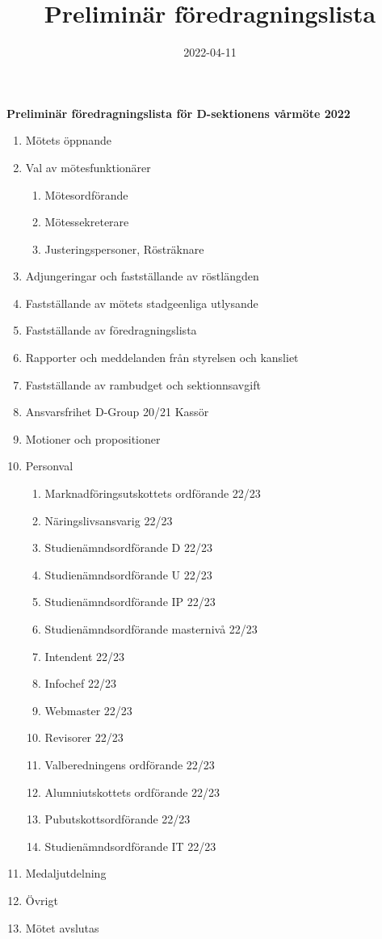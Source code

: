 \documentclass{datateknologsektionen-document}
\title{Preliminär föredragningslista}
\date{2022-04-11}
\begin{document}
\large
\begin{center}
  {\LARGE\bfseries Preliminär föredragningslista för D-sektionens vårmöte 2022}
  \vspace{2mm}
\end{center}

\Large
\begin{enumerate}[topsep=0pt,itemsep=1ex]
  \item Mötets öppnande
  \item Val av mötesfunktionärer
        \begin{enumerate}[label*=\arabic*.,leftmargin=3em]
          \item Mötesordförande
          \item Mötessekreterare
          \item Justeringspersoner, Rösträknare
        \end{enumerate}
  \item Adjungeringar och fastställande av röstlängden
  \item Fastställande av mötets stadgeenliga utlysande
  \item Fastställande av föredragningslista
  \item Rapporter och meddelanden från styrelsen och kansliet
  \item Fastställande av rambudget och sektionnsavgift
  \item Ansvarsfrihet D-Group 20/21 Kassör
  \item Motioner och propositioner
  \item Personval
        \begin{enumerate}[label*=\arabic*.,leftmargin=3em]
          \item Marknadföringsutskottets ordförande 22/23
          \item Näringslivsansvarig 22/23
          \item Studienämndsordförande D 22/23
          \item Studienämndsordförande U 22/23
          \item Studienämndsordförande IP 22/23
          \item Studienämndsordförande masternivå 22/23
          \item Intendent 22/23
          \item Infochef 22/23
          \item Webmaster 22/23
          \item Revisorer 22/23
          \item Valberedningens ordförande 22/23
          \item Alumniutskottets ordförande 22/23
          \item Pubutskottsordförande 22/23
          \item Studienämndsordförande IT 22/23
        \end{enumerate}
  \item Medaljutdelning
  \item Övrigt
  \item Mötet avslutas
\end{enumerate}
\end{document}
